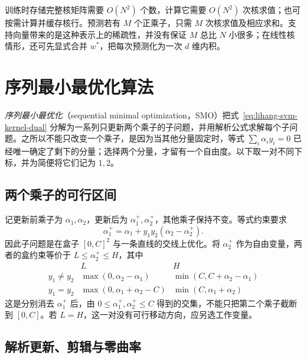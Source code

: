 训练时存储完整核矩阵需要 $O(N^2)$ 个数，计算它需要 $O(N^2)$ 次核求值；也可按需计算并缓存核行。预测若有 $M$ 个正乘子，只需 $M$ 次核求值及相应求和。支持向量带来的是这种表示上的稀疏性，并没有保证 $M$ 总比 $N$ 小很多；在线性核情形，还可先显式合并 $w^*$，把每次预测化为一次 $d$ 维内积。

\section{序列最小最优化算法}
\label{sec:lihang-svm-smo}

\emph{序列最小最优化}（sequential minimal optimization，SMO）把式~\eqref{eq:lihang-svm-kernel-dual} 分解为一系列只更新两个乘子的子问题，并用解析公式求解每个子问题。之所以不能只改变一个乘子，是因为当其他分量固定时，等式 $\sum_i\alpha_i y_i=0$ 已经唯一确定了剩下的分量；选择两个分量，才留有一个自由度。以下取一对不同下标，并为简便将它们记为 $1,2$。

\subsection{两个乘子的可行区间}

记更新前乘子为 $\alpha_1,\alpha_2$，更新后为 $\alpha_1^+,\alpha_2^+$，其他乘子保持不变。等式约束要求
\begin{equation}
  \alpha_1^+=\alpha_1+y_1y_2(\alpha_2-\alpha_2^+).
  \label{eq:lihang-svm-smo-equality}
\end{equation}
因此子问题是在盒子 $[0,C]^2$ 与一条直线的交线上优化。将 $\alpha_2^+$ 作为自由变量，两者的盒约束等价于 $L\le\alpha_2^+\le H$，其中
\begin{equation}
  \begin{array}{c|c|c}
    &L&H\\ \hline
    y_1\ne y_2&\max(0,\alpha_2-\alpha_1)
              &\min(C,C+\alpha_2-\alpha_1)\\
    y_1=y_2&\max(0,\alpha_1+\alpha_2-C)
            &\min(C,\alpha_1+\alpha_2)
  \end{array}
  \label{eq:lihang-svm-smo-bounds}
\end{equation}
这是分别消去 $\alpha_1^+$ 后，由 $0\le\alpha_1^+,\alpha_2^+\le C$ 得到的交集，不能只把第二个乘子截断到 $[0,C]$。若 $L=H$，这一对没有可行移动方向，应另选工作变量。

\subsection{解析更新、剪辑与零曲率}

